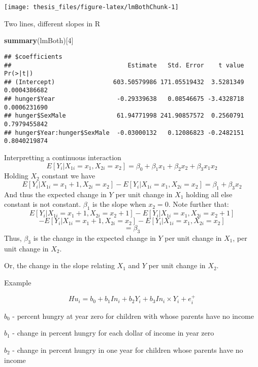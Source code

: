 \documentclass[12pt,openright,oneside,a4paper,chapter=TITLE,section=TITLE,subsection=Title,english,french,spanish,portugues,sumario=tradicional]{04-class-files/abntex2}
\newenvironment{Shaded}{\begin{snugshade}}{\end{snugshade}}
\newcommand{\DecValTok}[1]{\textcolor[rgb]{0.00,0.00,0.81}{#1}}
\newcommand{\KeywordTok}[1]{\textcolor[rgb]{0.13,0.29,0.53}{\textbf{#1}}}
\newcommand{\NormalTok}[1]{#1}
\begin{document}
\begin{center}\texttt{[image: thesis\_files/figure-latex/lmBothChunk-1]} \end{center}

Two lines, different slopes in R

\begin{Shaded}
\begin{Highlighting}[]
\KeywordTok{summary}\NormalTok{(lmBoth)[}\DecValTok{4}\NormalTok{]}
\end{Highlighting}
\end{Shaded}

\begin{verbatim}
## $coefficients
##                                Estimate   Std. Error    t value     Pr(>|t|)
## (Intercept)                603.50579986 171.05519432  3.5281349 0.0004386682
## hunger$Year                 -0.29339638   0.08546675 -3.4328718 0.0006231690
## hunger$SexMale              61.94771998 241.90857572  0.2560791 0.7979455842
## hunger$Year:hunger$SexMale  -0.03000132   0.12086823 -0.2482151 0.8040219874
\end{verbatim}

Interpretting a continuous interaction
\[
E[Y_i | X_{1i}=x_1, X_{2i}=x_2] = \beta_0 + \beta_1 x_{1} + \beta_2 x_{2} + \beta_3 x_{1}x_{2}
\]
Holding \(X_2\) constant we have
\[
E[Y_i | X_{1i}=x_1+1, X_{2i}=x_2]-E[Y_i | X_{1i}=x_1, X_{2i}=x_2]
= \beta_1 + \beta_3 x_{2} 
\]
And thus the expected change in \(Y\) per unit change in \(X_1\) holding all else constant is not constant. \(\beta_1\) is the slope when \(x_{2} = 0\). Note further that:
\[
E[Y_i | X_{1i}=x_1+1, X_{2i}=x_2+1]-E[Y_i | X_{1i}=x_1, X_{2i}=x_2+1]
\]
\[
-E[Y_i | X_{1i}=x_1+1, X_{2i}=x_2]-E[Y_i | X_{1i}=x_1, X_{2i}=x_2]
\]
\[
=\beta_3  
\]
Thus, \(\beta_3\) is the change in the expected change in \(Y\) per unit change in \(X_1\), per unit change in \(X_2\).

Or, the change in the slope relating \(X_1\) and \(Y\) per unit change in \(X_2\).

Example

\[Hu_i = b_0 + b_1 In_i + b_2 Y_i + b_3 In_i \times Y_i + e^+_i\]

\(b_0\) - percent hungry at year zero for children with whose parents have no income

\(b_1\) - change in percent hungry for each dollar of income in year zero

\(b_2\) - change in percent hungry in one year for children whose parents have no income
\end{document}
